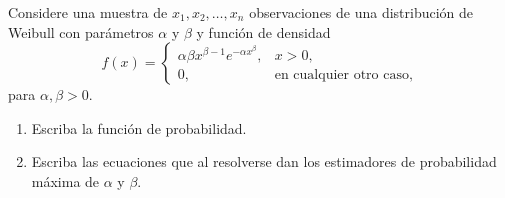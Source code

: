 \begin{enunciado}
 Considere una muestra de $x_1,x_2,\ldots,x_n$ observaciones de una distribuci\'on de Weibull con par\'ametros $\alpha$ y $\beta$ y funci\'on de densidad
 \begin{equation*}
  f(x) =
  \begin{cases}
   \alpha \beta x^{\beta - 1}e^{-\alpha x^{\beta}}, & x > 0, \\
   0, & \text{en cualquier otro caso,}
  \end{cases}
 \end{equation*}
 para $\alpha, \beta > 0$.
 \begin{enumerate}
  \item Escriba la funci\'on de probabilidad.
  \item Escriba las ecuaciones que al resolverse dan los estimadores de probabilidad m\'axima de $\alpha$ y $\beta$.
 \end{enumerate}
\end{enunciado}

